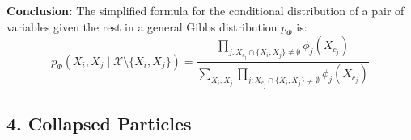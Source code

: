 \documentclass[a4 paper]{article}
\begin{document}
\begin{enumerate}
\begin{enumerate}
\end{enumerate}

\textbf{Conclusion:}
The simplified formula for the conditional distribution of a pair of variables given the rest in a general Gibbs distribution \( p_\Phi \) is:
\[
p_\Phi(X_i, X_j \mid \mathcal{X} \setminus \{X_i, X_j\}) = \frac{\prod_{j: X_{c_j} \cap \{X_i, X_j\} \ne \emptyset} \phi_j(X_{c_j})}{\sum_{X_i, X_j} \prod_{j: X_{c_j} \cap \{X_i, X_j\} \ne \emptyset} \phi_j(X_{c_j})}
\]

\end{enumerate}



\newpage
\subsection*{4. Collapsed Particles}
\end{document}
